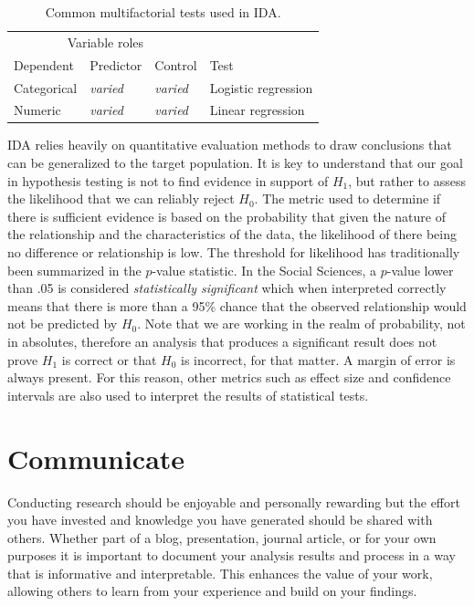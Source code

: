 \documentclass[
  letterpaper,
  DIV=11,
  numbers=noendperiod]{scrreport}
\theoremstyle{definition}
\theoremstyle{remark}
\begin{document}
\hypertarget{tbl-ida-methods-multifactorial}{}
\begin{table}
\caption{\label{tbl-ida-methods-multifactorial}Common multifactorial tests used in IDA. }\tabularnewline

\centering
\begin{tabular}{l>{}l>{}ll}
\toprule
\multicolumn{3}{c}{Variable roles} & \multicolumn{1}{c}{ } \\
\cmidrule(l{3pt}r{3pt}){1-3}
Dependent & Predictor & Control & Test\\
\midrule
Categorical & \em{varied} & \em{varied} & Logistic regression\\
Numeric & \em{varied} & \em{varied} & Linear regression\\
\bottomrule
\end{tabular}
\end{table}

IDA relies heavily on quantitative evaluation methods to draw
conclusions that can be generalized to the target population. It is key
to understand that our goal in hypothesis testing is not to find
evidence in support of \(H_1\), but rather to assess the likelihood that
we can reliably reject \(H_0\). The metric used to determine if there is
sufficient evidence is based on the probability that given the nature of
the relationship and the characteristics of the data, the likelihood of
there being no difference or relationship is low. The threshold for
likelihood has traditionally been summarized in the \(p\)-value
statistic. In the Social Sciences, a \(p\)-value lower than .05 is
considered \emph{statistically significant} which when interpreted
correctly means that there is more than a 95\% chance that the observed
relationship would not be predicted by \(H_0\). Note that we are working
in the realm of probability, not in absolutes, therefore an analysis
that produces a significant result does not prove \(H_1\) is correct or
that \(H_0\) is incorrect, for that matter. A margin of error is always
present. For this reason, other metrics such as effect size and
confidence intervals are also used to interpret the results of
statistical tests.

\hypertarget{sec-aa-communicate}{%
\section{Communicate}\label{sec-aa-communicate}}

Conducting research should be enjoyable and personally rewarding but the
effort you have invested and knowledge you have generated should be
shared with others. Whether part of a blog, presentation, journal
article, or for your own purposes it is important to document your
analysis results and process in a way that is informative and
interpretable. This enhances the value of your work, allowing others to
learn from your experience and build on your findings.
\end{document}
